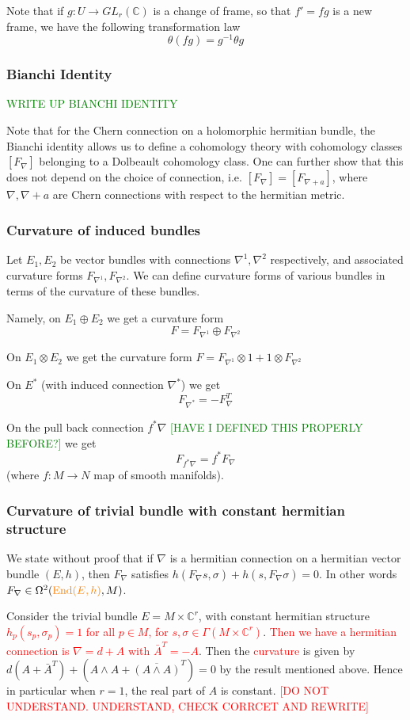 \documentclass[a4paper]{article}
\theoremstyle{definition} \newtheorem*{definition}{Definition}
\theoremstyle{definition} \newtheorem*{definitions}{Definitions}
\theoremstyle{plain} \newtheorem{theorem}{Theorem}[section]
\theoremstyle{plain} \newtheorem{proposition}[theorem]{Proposition}
\theoremstyle{plain} \newtheorem{corollary}[theorem]{Corollary}
\theoremstyle{plain} \newtheorem{lemma}[theorem]{Lemma}
\theoremstyle{plain} \newtheorem{example}[theorem]{Example}
\newcommand{\checkCorrect}[1]{\textcolor{red}{#1}}
\newcommand{\understandBetter}[1]{\textcolor{orange}{#1}}
\newcommand{\finish}[1]{\textcolor{green}{#1}}
\newcommand{\complexnos}{\mathbb{C}}
\newcommand{\End}{\text{End}}
\begin{document}
Note that if $g:U\to GL_r(\complexnos)$ is a change of frame, so that $f'=fg$ is a new frame, we have the following transformation law
$$\mathfrak{\theta}(fg)=g^{-1} \mathbb{\theta}g$$

\subsubsection{Bianchi Identity}
\finish{WRITE UP BIANCHI IDENTITY}

Note that for the Chern connection on a holomorphic hermitian bundle, the Bianchi identity allows us to define a cohomology theory with cohomology classes $[F_\nabla]$ belonging to a Dolbeault cohomology class. One can further show that this does not depend on the choice of connection, i.e. $[F_\nabla]=[F_{\nabla+a}]$, where $\nabla, \nabla+a$ are Chern connections with respect to the hermitian metric. 

\subsubsection{Curvature of induced bundles}
Let $E_1, E_2$ be vector bundles with connections $\nabla^1, \nabla^2$ respectively, and associated curvature forms $F_{\nabla^1}, F_{\nabla^2}$. We can define curvature forms of various bundles in terms of the curvature of these bundles. 

Namely, on $E_1\oplus E_2$ we get a  curvature form
$$F = F_{\nabla^1}\oplus F_{\nabla^2}$$

On $E_1\otimes E_2$ we get the curvature form
$F=F_{\nabla^1}\otimes 1 + 1\otimes F_{\nabla^2}$

On $E^*$ (with induced connection $\nabla^*$) we get
$$F_{\nabla^*}=-F_{\nabla}^T$$

On the pull back connection $f^*\nabla$ \finish{[HAVE I DEFINED THIS PROPERLY BEFORE?]} we get
$$F_{f^* \nabla} = f^* F_\nabla$$
(where $f:M\to N$ map of smooth manifolds).

\subsubsection{Curvature of trivial bundle with constant hermitian structure}
We state without proof that if $\nabla$ is a hermitian connection on a hermitian vector bundle $(E, h)$, then $F_\nabla$ satisfies $h(F_\nabla s, \sigma)+h(s, F_\nabla \sigma)=0$. In other words $F_\nabla\in \Omega^2(\understandBetter{\End(E,h)}, M)$.

Consider the trivial bundle $E=M\times \complexnos^r$, with constant hermitian structure \checkCorrect{$h_p(s_p, \sigma_p)=1$ for all $p\in M$, for $s, \sigma\in \Gamma(M\times \complexnos^r)$}. \checkCorrect{Then we have a hermitian connection is $\nabla=d+A$ with $\bar{A}^T=-A$}. Then the \checkCorrect{curvature} is given by $d(A+\bar{A}^T)+(A\wedge A +\overline{(A\wedge A)}^T)=0$ by the result mentioned above. Hence in particular when $r=1$, the real part of $A$
 is constant. 
 \checkCorrect{[DO NOT UNDERSTAND. UNDERSTAND, CHECK CORRCET AND REWRITE]}
\end{document}
